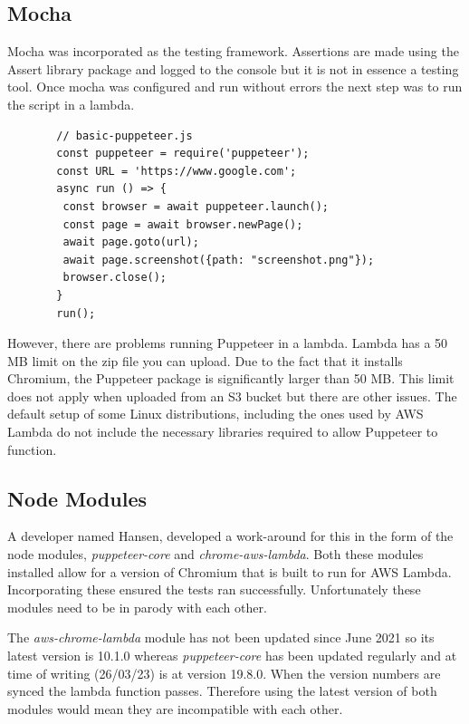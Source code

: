 \documentclass[12pt,a4paper,titlepage]{report}
\begin{document}
\subsection{Mocha}

Mocha was incorporated as the testing framework. Assertions are made using the Assert library package and logged to the console but it is not in essence a testing tool.
Once mocha was configured and run without errors the next step was to run the script in a lambda.

\begin{figure}[H]
 \begin{tcolorbox}
  \begin{verbatim}
  // basic-puppeteer.js
  const puppeteer = require('puppeteer');
  const URL = 'https://www.google.com';
  async run () => {
   const browser = await puppeteer.launch();
   const page = await browser.newPage();
   await page.goto(url);
   await page.screenshot({path: "screenshot.png"});
   browser.close();
  }
  run();
\end{verbatim}
\end{tcolorbox}
\end{figure}
However, there are problems running Puppeteer in a lambda. Lambda has a 50 MB limit on the zip file you can upload. 
Due to the fact that it installs Chromium, the Puppeteer package is significantly larger than 50 {MB}. This 
limit does not apply when uploaded from an \ac{S3} bucket but there are other issues. 
The default setup of some Linux distributions, including the ones used by AWS Lambda do not include the necessary libraries required to allow Puppeteer to function.

\subsection{Node Modules}

A developer named Hansen\autocite{Hansen}, developed a work-around for this in the form of the node modules, \textit{puppeteer-core} and \textit{chrome-aws-lambda}.
Both these modules installed allow for a version of Chromium that is built to run for AWS Lambda. Incorporating
these ensured the tests ran successfully. Unfortunately these modules need to be in parody with each other.

The \textit{aws-chrome-lambda} module has not been updated since June 2021 so its latest version is 10.1.0 whereas
\textit{puppeteer-core} has been updated regularly and at time of writing (26/03/23) is at version 19.8.0. When the version numbers are
synced the lambda function passes. Therefore using the latest version of both modules would mean they are incompatible with each other.
\end{document}
